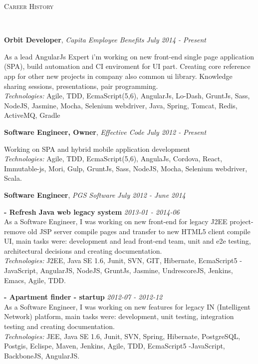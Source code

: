 \documentclass[9pt]{article}
\newenvironment{changemargin}[2]{%
  \begin{list}{}{%
      \setlength{\topsep}{0pt}%
      \setlength{\leftmargin}{#1}%
      \setlength{\rightmargin}{#2}%
      \setlength{\listparindent}{\parindent}%
      \setlength{\itemindent}{\parindent}%
      \setlength{\parsep}{\parskip}%
    }%
  \item[]}{\end{list}
}
\newcommand{\lineover}{
  \begin{changemargin}{-0.05in}{-0.05in}
    \vspace*{-8pt}
    \hrulefill \\
    \vspace*{-2pt}
  \end{changemargin}
}
\newcommand{\header}[1]{
	\begin{changemargin}{-0.5in}{-0.5in}
		\scshape{#1}\\
  	\lineover
	\end{changemargin}
}
\newcommand{\jobtitle}[3]{
	\textbf{#1}, \emph{#2} \hfill \emph{#3}\\
}
\newcommand{\jobdescription}[1]{
	\begin{changemargin}{0.15in}{0.15in}
    \smallskip
		{#1}
    \medskip
	\end{changemargin}
}
\newenvironment{body} {
	\vspace*{-16pt}
	\begin{changemargin}{-0.25in}{-0.5in}
  }
	{\end{changemargin}
}
\begin{document}
\header{Career History}
\begin{body}
  \vspace{14pt}


  \jobtitle{Orbit Developer}{Capita Employee Benefits}{July 2014 - Present}
  \jobdescription{
    As a lead AngularJs Expert i'm working on new front-end single page application (SPA), build automation and CI enviroment for UI part.
    Creating core reference app for other new projects in company also common ui library.
    Knowledge sharing sessions, presentations, pair programming.\\
    \emph{Technologies:} Agile, TDD, EcmaScript(5,6), AngularJs, Lo-Dash, GruntJs, Sass, NodeJS, Jasmine, Mocha, Selenium webdriver, Java, Spring, Tomcat,  Redis, ActiveMQ, Gradle
  }

  \jobtitle{Software Engineer, Owner}{Effective Code}{July 2012 - Present}
  \jobdescription{
    Working on SPA and hybrid mobile application development\\
    \emph{Technologies:} Agile, TDD, EcmaScript(5,6), AngulaJs, Cordova, React, Immutable-js, Mori, Gulp, GruntJs, Sass, NodeJS, Mocha, Selenium webdriver, Scala.
  }

  \jobtitle{Software Engineer}{PGS Software}{July 2012 - June 2014}
  \jobdescription{
    \medskip

    \textbf{- Refresh Java web legacy system}{} \hfill \emph{2013-01 - 2014-06}{} \\
    As a Software Engineer, I was working on new front-end for legacy J2EE project- remove old JSP server compile pages and transfer to new HTML5 client compile UI, main tasks were: development and lead front-end team, unit and e2e testing, architectural decisions and creating documentation.\\
    \emph{Technologies:} J2EE, Java SE 1.6, Junit, SVN, GIT, Hibernate, EcmaScript5 - JavaScript, AngularJS, NodeJS, GruntJs, Jasmine, UndrescoreJS, Jenkins, Emacs, Agile, TDD.
    \medskip

    \textbf{- Apartment finder - startup}{} \hfill \emph{2012-07 - 2012-12}{} \\
    As a Software Engineer, I was working on new features for legacy IN (Intelligent Network) platform, main tasks were: development, unit testing, integration testing and creating documentation.\\
    \emph{Technologies:} JEE, Java SE 1.6, Junit, SVN, Spring, Hibernate, PostgreSQL, Postgis, Eclispe, Maven, Jenkins, Agile, TDD, EcmaScript5 -JavaScript, BackboneJS, AngularJS.
  }


\end{body}
\end{document}

